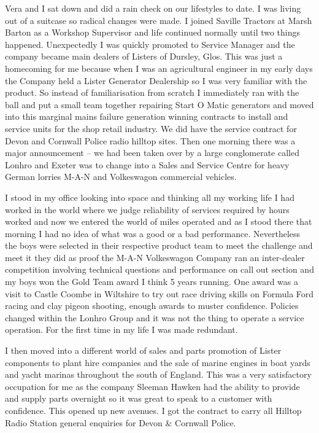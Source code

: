 
Vera and I sat down and did a rain check on our
lifestyles to date. I was living out of a suitcase so radical changes were
made. I joined Saville Tractors at Marsh Barton as a Workshop Supervisor and
life continued normally until two things happened. Unexpectedly I was quickly
promoted to Service Manager and the company became main dealers of Listers of
Dursley, Glos. This was just a homecoming for me because when I was an
agricultural engineer in my early days the Company held a Lister Generator
Dealership so I was very familiar with the product. So instead of
familiarisation from scratch I immediately ran with the ball and put a small
team together repairing Start O Matic generators and moved into this marginal
mains failure generation winning contracts to install and service units for the
shop retail industry. We did have the service contract for Devon and Cornwall
Police radio hilltop sites. Then one morning there was a major announcement –
we had been taken over by a large conglomerate called Lonhro and Exeter was to
change into a Sales and Service Centre for heavy German lorries M-A-N and
Volkeswagon commercial vehicles.

I stood in my office looking into space and thinking all my working life I had
worked in the world where we judge reliability of services required by hours
worked and now we entered the world of miles operated and as I stood there that
morning I had no idea of what was a good or a bad performance. Nevertheless
the boys were selected in their respective product team to meet the challenge
and meet it they did as proof the M-A-N Volkeswagon Company ran an inter-dealer
competition involving technical questions and performance on call out section
and my boys won the Gold Team award I think 5 years running. One award was a
visit to Castle Coombe in Wiltshire to try out race driving skills on Formula
Ford racing and clay pigeon shooting, enough awards to muster confidence.
Policies changed within the Lonhro Group and it was not the thing to operate a
service operation. For the first time in my life I was made redundant.

I then moved into a different world of sales and parts promotion of Lister
components to plant hire companies and the sale of marine engines in boat yards
and yacht marinas throughout the south of England. This was a very
satisfactory occupation for me as the company Sleeman Hawken had the ability to
provide and supply parts overnight so it was great to speak to a customer with
confidence. This opened up new avenues. I got the
contract to carry all Hilltop Radio Station general enquiries for Devon \&
Cornwall Police.

